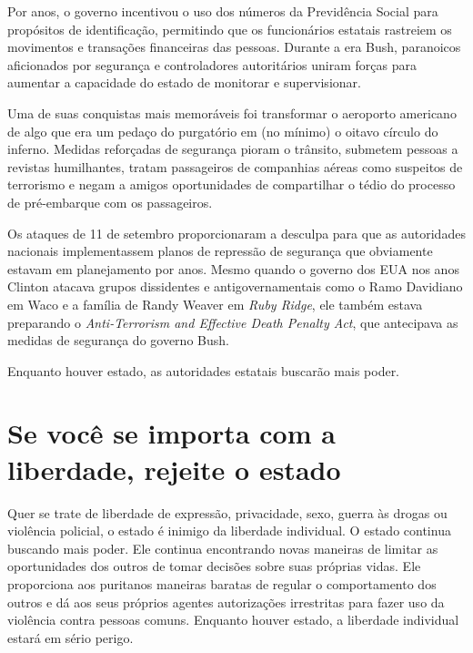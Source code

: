 Por anos, o governo incentivou o uso dos números da Previdência Social para propósitos de identificação, permitindo que os funcionários estatais rastreiem os movimentos e transações financeiras das pessoas. Durante a era Bush, paranoicos aficionados por segurança e controladores autoritários uniram forças para aumentar a capacidade do estado de monitorar e supervisionar.

Uma de suas conquistas mais memoráveis foi transformar o aeroporto americano de algo que era um pedaço do purgatório em (no mínimo) o oitavo círculo do inferno. Medidas reforçadas de segurança pioram o trânsito, submetem pessoas a revistas humilhantes, tratam passageiros de companhias aéreas como suspeitos de terrorismo e negam a amigos oportunidades de compartilhar o tédio do processo de pré-embarque com os passageiros.

Os ataques de 11 de setembro proporcionaram a desculpa para que as autoridades nacionais implementassem planos de repressão de segurança que obviamente estavam em planejamento por anos. Mesmo quando o governo dos EUA nos anos Clinton atacava grupos dissidentes e antigovernamentais como o Ramo Davidiano em Waco e a família de Randy Weaver em \emph{Ruby Ridge}, ele também estava preparando o \emph{Anti-Terrorism and Effective Death Penalty Act}, que antecipava as medidas de segurança do governo Bush.

Enquanto houver estado, as autoridades estatais buscarão mais poder.

\section{Se você se importa com a liberdade, rejeite o estado}

Quer se trate de liberdade de expressão, privacidade, sexo, guerra às drogas ou violência policial, o estado é inimigo da liberdade individual. O estado continua buscando mais poder. Ele continua encontrando novas maneiras de limitar as oportunidades dos outros de tomar decisões sobre suas próprias vidas. Ele proporciona aos puritanos maneiras baratas de regular o comportamento dos outros e dá aos seus próprios agentes autorizações irrestritas para fazer uso da violência contra pessoas comuns. Enquanto houver estado, a liberdade individual estará em sério perigo.
